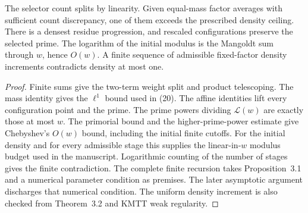 \begin{lemma}\label{checked-density}
\leanok
The selector count splits by linearity. Given equal-mass factor
averages with sufficient count discrepancy, one of them
exceeds the prescribed density ceiling. There is a densest residue
progression, and rescaled configurations preserve the selected
prime. The logarithm of the initial modulus is the Mangoldt sum
through $w$, hence $O(w)$. A finite sequence of admissible
fixed-factor density increments contradicts density at most one.
\end{lemma}
\begin{proof}
\leanok
Finite sums give the two-term weight split and product telescoping.
The mass identity gives the $\ell^1$ bound used in (20).
The affine identities lift every configuration point and the prime.
The prime powers dividing $\mathcal L(w)$ are exactly those at most
$w$. The primorial bound and the higher-prime-power estimate give
Chebyshev's $O(w)$ bound, including the initial finite cutoffs.
For the initial density and for every admissible stage this supplies
the linear-in-$w$ modulus budget used in the manuscript.
Logarithmic counting of the number of stages gives the finite
contradiction. The complete finite recursion takes Proposition~3.1
and a numerical parameter condition as premises. The later
asymptotic argument discharges that numerical condition. The
uniform density increment is also checked from Theorem~3.2
and KMTT weak regularity.
\end{proof}

